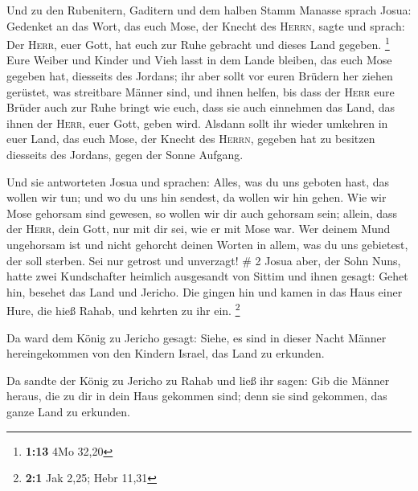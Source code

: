  Und zu den Rubenitern, Gaditern und dem halben Stamm
Manasse sprach Josua:  Gedenket an das Wort, das euch
Mose, der Knecht des \textsc{Herrn}, sagte und sprach: Der
\textsc{Herr}, euer Gott, hat euch zur Ruhe gebracht und dieses Land
gegeben. \footnote{\textbf{1:13} 4Mo 32,20}  Eure Weiber
und Kinder und Vieh lasst in dem Lande bleiben, das euch Mose gegeben
hat, diesseits des Jordans; ihr aber sollt vor euren Brüdern her ziehen
gerüstet, was streitbare Männer sind, und ihnen helfen, 
bis dass der \textsc{Herr} eure Brüder auch zur Ruhe bringt wie euch,
dass sie auch einnehmen das Land, das ihnen der \textsc{Herr}, euer
Gott, geben wird. Alsdann sollt ihr wieder umkehren in euer Land, das
euch Mose, der Knecht des \textsc{Herrn}, gegeben hat zu besitzen
diesseits des Jordans, gegen der Sonne Aufgang.

 Und sie antworteten Josua und sprachen: Alles, was du
uns geboten hast, das wollen wir tun; und wo du uns hin sendest, da
wollen wir hin gehen.  Wie wir Mose gehorsam sind
gewesen, so wollen wir dir auch gehorsam sein; allein, dass der
\textsc{Herr}, dein Gott, nur mit dir sei, wie er mit Mose war.
 Wer deinem Mund ungehorsam ist und nicht gehorcht deinen
Worten in allem, was du uns gebietest, der soll sterben. Sei nur getrost
und unverzagt! \# 2  Josua aber, der Sohn Nuns, hatte zwei
Kundschafter heimlich ausgesandt von Sittim und ihnen gesagt: Gehet hin,
besehet das Land und Jericho. Die gingen hin und kamen in das Haus einer
Hure, die hieß Rahab, und kehrten zu ihr ein. \footnote{\textbf{2:1} Jak
  2,25; Hebr 11,31}

 Da ward dem König zu Jericho gesagt: Siehe, es sind in
dieser Nacht Männer hereingekommen von den Kindern Israel, das Land zu
erkunden.

 Da sandte der König zu Jericho zu Rahab und ließ ihr
sagen: Gib die Männer heraus, die zu dir in dein Haus gekommen sind;
denn sie sind gekommen, das ganze Land zu erkunden.

